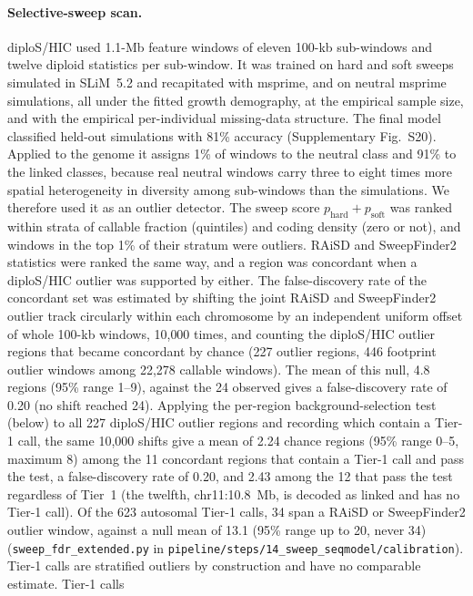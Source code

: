 \documentclass[11pt]{article}
\begin{document}
\paragraph{Selective-sweep scan.}
diploS/HIC used 1.1-Mb feature windows of eleven 100-kb sub-windows and twelve diploid statistics per
sub-window. It was trained on hard and soft sweeps simulated in SLiM~5.2 and recapitated with msprime, and on
neutral msprime simulations, all under the fitted growth demography, at the empirical sample size, and with the
empirical per-individual missing-data structure. The final model classified held-out simulations with 81\%
accuracy (Supplementary Fig.~S20). Applied to the genome it assigns 1\% of windows to the neutral class and 91\% to
the linked classes, because real neutral windows carry three to eight times more spatial heterogeneity in
diversity among sub-windows than the simulations. We therefore used it as an outlier detector. The sweep score
$p_\mathrm{hard}+p_\mathrm{soft}$ was ranked within strata of callable fraction (quintiles) and coding density
(zero or not), and windows in the top 1\% of their stratum were outliers. RAiSD and SweepFinder2 statistics were
ranked the same way, and a region was concordant when a diploS/HIC outlier was supported by either. The
false-discovery rate of the concordant set was estimated by shifting the joint RAiSD and SweepFinder2 outlier track
circularly within each chromosome by an independent uniform offset of whole 100-kb windows, 10{,}000 times, and
counting the diploS/HIC outlier regions that became concordant by chance (227 outlier regions, 446 footprint
outlier windows among 22{,}278 callable windows). The mean of this null, 4.8 regions (95\% range 1--9), against the 24 observed gives a false-discovery rate of 0.20 (no shift reached 24). Applying the per-region background-selection test (below) to all 227 diploS/HIC outlier regions and recording which contain a Tier-1 call, the same 10{,}000 shifts give a mean of 2.24 chance regions (95\% range 0--5, maximum 8) among the 11 concordant regions that contain a Tier-1 call and pass the test, a false-discovery rate of 0.20, and 2.43 among the 12 that pass the test regardless of Tier~1 (the twelfth, chr11:10.8~Mb, is decoded as linked and has no Tier-1 call). Of the 623 autosomal Tier-1 calls, 34 span a RAiSD or SweepFinder2 outlier window, against a null mean of 13.1 (95\% range up to 20, never 34) (\texttt{sweep\_fdr\_extended.py} in \texttt{pipeline/steps/14\_sweep\_seqmodel/calibration}). Tier-1 calls are stratified outliers by
construction and have no comparable estimate. Tier-1 calls
\end{document}

